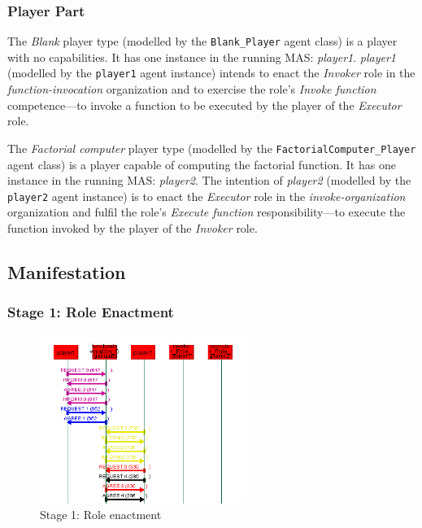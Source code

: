 \subsubsection*{Player Part}

The \textit{Blank} player type (modelled by the \texttt{Blank\_Player} agent class) is a player with no capabilities.
It has one instance in the running MAS: \textit{player1}.
\textit{player1} (modelled by the \texttt{player1} agent instance) intends to enact the \textit{Invoker} role in the \textit{function-invocation} organization and to exercise the role's \textit{Invoke function} competence---to invoke a function to be executed by the player of the \textit{Executor} role.

The \textit{Factorial computer} player type (modelled by the \texttt{FactorialComputer\_Player} agent class) is a player capable of computing the factorial function.
It has one instance in the running MAS: \textit{player2}.
The intention of \textit{player2} (modelled by the \texttt{player2} agent instance) is to enact the \textit{Executor} role in the \textit{invoke-organization} organization and fulfil the role's \textit{Execute function} responsibility---to execute the function invoked by the player of the \textit{Invoker} role.

\subsection*{Manifestation}

\subsubsection*{Stage 1: Role Enactment}

\begin{figure}[H]
	\centering
	\includegraphics[width=0.6\textwidth]{images/examples/example1-stage1}
	\caption{Stage 1: Role enactment}
	\label{figure:example1-stage1}
\end{figure}

